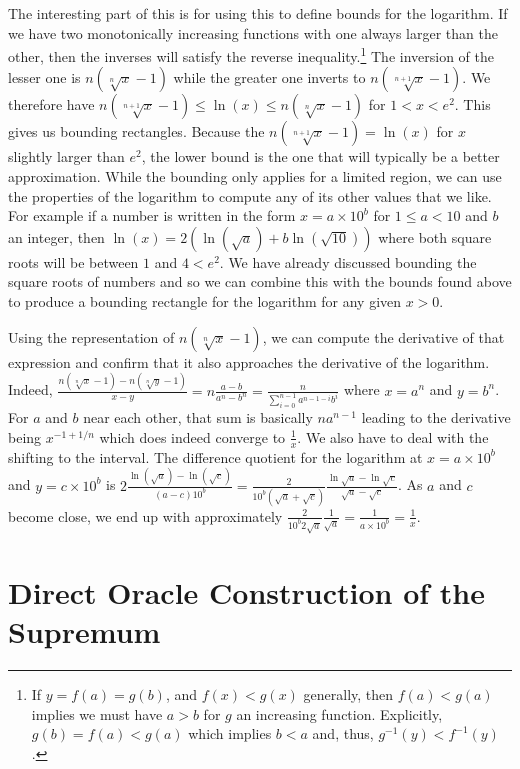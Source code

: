 \documentclass[12pt]{article}
\begin{document}
The interesting part of this is for using this to define bounds for the logarithm. If we have two monotonically increasing functions with one always larger than the other, then the inverses will satisfy the reverse inequality.\footnote{If $y = f(a)=g(b)$, and $f(x) < g(x)$ generally, then $f(a) < g(a)$ implies we must have $a > b$ for $g$ an increasing function. Explicitly, $g(b) = f(a) < g(a)$ which implies $b < a$ and, thus, $g^{-1} (y) < f^{-1} (y)$.}  The inversion of the lesser one is $n(\sqrt[n]{ x }- 1)$ while the greater one inverts to $n(\sqrt[n+1]{x} - 1)$. We therefore have $n(\sqrt[n+1]{x} - 1) \leq \ln(x) \leq n (\sqrt[n]{x}-1)$ for $1 < x < e^2$. This gives us bounding rectangles. Because the $n (\sqrt[n+1]{x} - 1) = \ln(x)$ for $x$ slightly larger than $e^2$, the lower bound is the one that will typically be a better approximation.  While the bounding only applies for a limited region, we can use the properties of the logarithm to compute any of its other values that we like. For example if a number is written in the form $x=a\times 10^b$ for $1 \leq a < 10$ and $b$ an integer, then $\ln(x) = 2 ( \ln( \sqrt{a} ) + b \ln(\sqrt{10}) )$ where both square roots will be between $1$ and $4< e^2$. We have already discussed bounding the square roots of numbers and so we can combine this with the bounds found above to produce a bounding rectangle for the logarithm for any given $x>0$. 

Using the representation of $ n (\sqrt[n]{x}-1)$, we can compute the derivative of that expression and confirm that it also approaches the derivative of the logarithm. Indeed, $\frac{ n (\sqrt[n]{x}-1) -  n (\sqrt[n]{y}-1)}{x-y} = n \frac{a-b}{a^n -b^n} = \frac{n}{\sum_{i=0}^{n-1} a^{n-1-i} b^i}$ where $x = a^n$ and $y = b^n$.  For $a$ and $b$ near each other, that sum is basically $n a^{n-1}$ leading to the derivative being $x^{-1+1/n}$ which does indeed converge to $\frac{1}{x}$. We also have to deal with the shifting to the interval. The difference quotient for the logarithm at $x = a\times 10^b$ and $y = c \times 10^b$ is $2 \frac{\ln(\sqrt{a}) - \ln(\sqrt{c})}{(a-c)10^b} = \frac{2}{10^b(\sqrt{a}+\sqrt{c})} \frac{\ln \sqrt{a} - \ln \sqrt{c} }{\sqrt{a}- \sqrt{c}} $. As $a$ and $c$ become close, we end up with approximately $\frac{2}{10^b 2 \sqrt{a}} \frac{1}{\sqrt{a}} = \frac{1}{a\times 10^b} = \frac{1}{x}$.



\section{Direct Oracle Construction of the Supremum}\label{app:sup}
\end{document}
